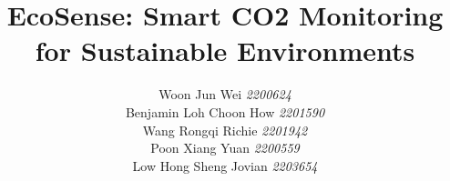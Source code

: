 \documentclass[conference]{IEEEtran}
\begin{document}
\title{EcoSense: Smart CO2 Monitoring for Sustainable Environments}

\author{
        Woon Jun Wei \textit{2200624} \\
        Benjamin Loh Choon How \textit{2201590} \\
        Wang Rongqi Richie \textit{2201942} \\
        Poon Xiang Yuan \textit{2200559} \\
        Low Hong Sheng Jovian \textit{2203654}\\
    }
    




% 
\end{document}
